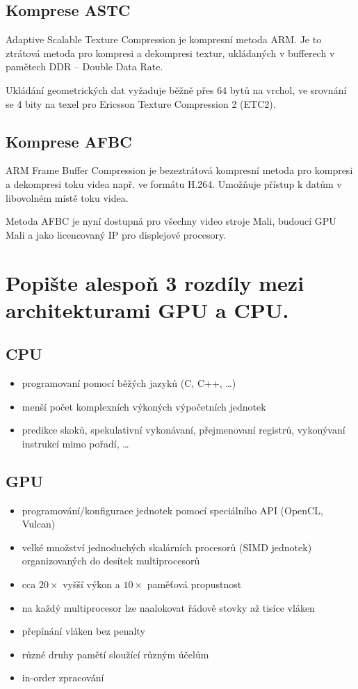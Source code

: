 	\subsection*{Komprese ASTC}
		Adaptive Scalable Texture Compression je kompresní metoda ARM. Je to ztrátová metoda pro kompresi a dekompresi textur, ukládaných v bufferech v pamětech DDR – Double Data Rate.
		
		Ukládání geometrických dat vyžaduje běžně přes 64 bytů na vrchol, ve srovnání se 4 bity na texel pro Ericsson Texture Compression 2 (ETC2).

	\subsection*{Komprese AFBC}
		ARM Frame Buffer Compression je bezeztrátová kompresní metoda pro kompresi a dekompresi toku videa např. ve formátu H.264. Umožňuje přístup k datům v libovolném místě toku videa.
	
	Metoda AFBC je nyní dostupná pro všechny video stroje Mali, budoucí GPU Mali a jako licencovaný IP pro displejové procesory. 
	
	
\section{Popište alespoň 3 rozdíly mezi architekturami GPU a CPU.}
	\subsection*{CPU}
		\begin{itemize}
			\setlength\itemsep{0em}
			\item programovaní pomocí běžých jazyků (C, C++, \dots)
			\item menší počet komplexních výkoných výpočetních jednotek
			\item predikce skoků, spekulativní vykonávaní, přejmenovaní registrů, vykonývaní instrukcí mimo pořadí, \dots
		\end{itemize}
	\subsection*{GPU}
		\begin{itemize}
			\setlength\itemsep{0em}
			\item programování/konfigurace jednotek pomocí speciálního API (OpenCL, Vulcan)
			\item velké množství jednoduchých skalárních procesorů (SIMD jednotek) organizovaných do desítek multiprocesorů
			\item cca $20\times$ vyšší výkon a $10\times$ paměťová propustnost			
			\item na každý multiprocesor lze naalokovat řádově stovky až tisíce vláken
			\item přepínání vláken bez penalty
			\item různé druhy pamětí sloužící různým účelům
			\item in-order zpracování
		\end{itemize}
	

